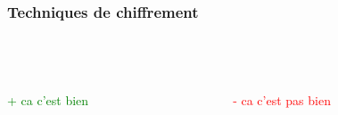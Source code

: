         \begin{frame}
            \frametitle{Techniques de chiffrement}
            \begin{columns}
                \begin{column}{.4\linewidth}
                    \\
                    \pause
                    \pause
                    \begin{columns}
                        \begin{column}{.5\linewidth}
                            \textcolor{green}{+ ca c'est bien}
                        \end{column}

                        \begin{column}{.5\linewidth}
                            \textcolor{red}{- ca c'est pas bien}
                        \end{column}
                    \end{columns}
                \end{column}


\end{columns}
\end{frame}
